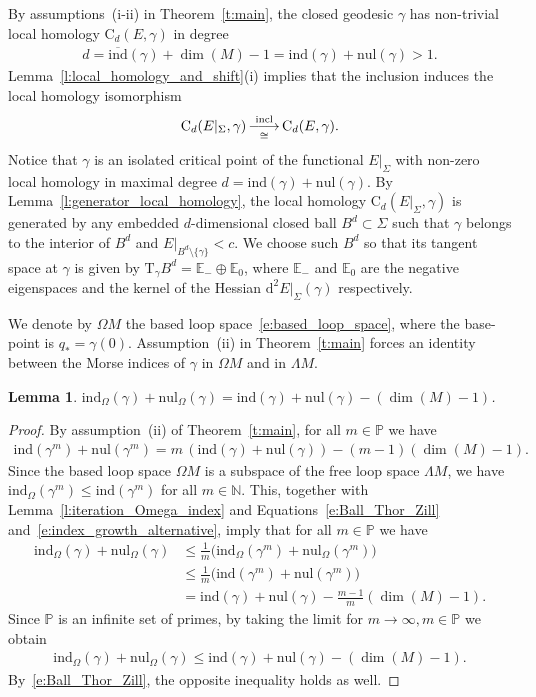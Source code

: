 \documentclass[reqno]{amsart}
\numberwithin{equation}{section}
\theoremstyle{personal}%
\newtheorem{lem}[thm]{Lemma}
\theoremstyle{definition}
\newcommand{\N}{\mathds{N}}
\newcommand{\E}{\mathds{E}}
\newcommand{\PP}{\mathds{P}}
\newcommand{\diff}{\mathrm{d}}
\newcommand{\incl}{\mathrm{incl}}
\newcommand{\Tan}{\mathrm{T}}
\newcommand{\Loc}{\mathrm{C}}
\newcommand{\avind}{\overline{\ind}}
\newcommand{\ind}{\mathrm{ind}}
\newcommand{\nul}{\mathrm{nul}}
\DeclareRobustCommand{\llongrightarrow}{\relbar\joinrel\relbar\joinrel\rightarrow}
\DeclareMathOperator*{\ttoup}{\llongrightarrow}
\begin{document}
By assumptions~(i-ii) in Theorem~\ref{t:main}, the closed geodesic $\gamma$ has non-trivial local homology $\Loc_d(E,\gamma)$ in degree
\begin{align*}
d=\avind(\gamma) + \dim(M)-1 = \ind(\gamma) + \nul(\gamma)>1.
\end{align*}
Lemma~\ref{l:local_homology_and_shift}(i) implies that the inclusion induces the local homology isomorphism \[\Loc_d(E|_\Sigma,\gamma)\ttoup_{\cong}^{\incl}\Loc_d(E,\gamma).\]
Notice that $\gamma$ is an isolated critical point of the functional $E|_\Sigma$ with non-zero local homology in maximal degree $d=\ind(\gamma) + \nul(\gamma)$. By Lemma~\ref{l:generator_local_homology}, the local homology $\Loc_d(E|_\Sigma,\gamma)$ is generated by any embedded $d$-dimensional closed ball $B^d\subset\Sigma$ such that $\gamma$ belongs to the interior of $B^d$ and $E|_{B^d\setminus\{\gamma\}}<c$. We choose such $B^d$ so that its tangent space at $\gamma$ is given by $\Tan_\gamma B^d=\E_-\oplus \E_0$, where $\E_-$ and $\E_0$ are the negative eigenspaces and the kernel of the Hessian $\diff^2E|_{\Sigma}(\gamma)$ respectively.

We denote by $\Omega M$ the based loop space~\eqref{e:based_loop_space}, where the base-point is $q_*=\gamma(0)$. Assumption~(ii) in Theorem~\ref{t:main} forces an identity between the Morse indices of $\gamma$ in $\Omega M$ and in $\Lambda M$.

\begin{lem}\label{l:equality_indices}
$\ind_\Omega(\gamma)+\nul_\Omega(\gamma)=\ind(\gamma)+\nul(\gamma)-(\dim(M)-1)$.
\end{lem}


\begin{proof}
By assumption~(ii) of Theorem~\ref{t:main}, for all $m\in\PP$ we have
\begin{align}
\label{e:index_growth_alternative}
\ind(\gamma^m) + \nul(\gamma^m)
=
m\,(\ind(\gamma)+\nul(\gamma)) - (m-1)(\dim(M)-1).
\end{align}
Since the based loop space $\Omega M$ is a subspace of the free loop space $\Lambda M$, we have
$\ind_\Omega(\gamma^m)\leq\ind(\gamma^m)$ for all $m\in\N$. This, together with Lemma~\ref{l:iteration_Omega_index} and Equations~\eqref{e:Ball_Thor_Zill} and~\eqref{e:index_growth_alternative}, imply that for all $m\in\PP$ we have
\begin{align*}
 \ind_\Omega(\gamma)+\nul_\Omega(\gamma)
 & \leq
 \tfrac{1}{m}\big( \ind_\Omega(\gamma^m) +\nul_\Omega(\gamma^m) \big)\\
 & \leq
 \tfrac{1}{m} \big( \ind(\gamma^m) + \nul(\gamma^m) \big)\\
 & =
 \ind(\gamma) + \nul(\gamma) - \tfrac{m-1}{m}(\dim(M)-1).
\end{align*}
Since $\PP$ is an infinite set of primes, by taking the limit for $m\to\infty, m\in\PP$ we obtain
\begin{align*}
  \ind_\Omega(\gamma)+\nul_\Omega(\gamma)  \leq
 \ind(\gamma) + \nul(\gamma)  - (\dim(M)-1).
\end{align*}
By~\eqref{e:Ball_Thor_Zill}, the opposite inequality holds as well.
\end{proof}
\end{document}
